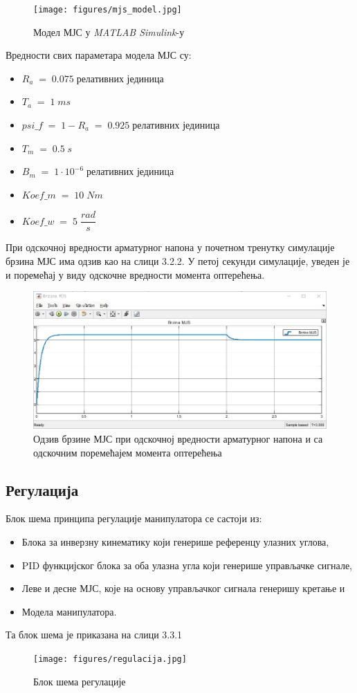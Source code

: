 \documentclass[12pt]{article}
\begin{document}
\begin{figure}[H]
    \centering
    \texttt{[image: figures/mjs\_model.jpg]}
    \caption{Модел МЈС у \textit{MATLAB Simulink}-у}
    \label{fig:мјс_simulink}
\end{figure}
Вредности свих параметара модела МЈС су:
\begin{itemize}
    \item $R_a\;=\;0.075\;$релативних јединица
    \item $T_a\;=\;1\;ms$
    \item $psi\_f\;=\;1-R_a\;=\;0.925\;$релативних јединица
    \item $T_m\;=\;0.5\;s$
    \item $B_m\;=\;1\cdot10^{-6}\;$релативних јединица
    \item $Koef\_m\;=\;10\;Nm$
    \item $Koef\_w\;=\;5\;\dfrac{rad}{s}$
\end{itemize}
При одскочној вредности арматурног напона у почетном тренутку симулације брзина МЈС има одзив као на слици 3.2.2. У петој секунди симулације, уведен је и поремећај у виду одскочне вредности момента оптерећења.
\begin{figure}[H]
    \centering
    \includegraphics[width=17.5cm]{figures/brzina_mjs.jpg}
    \caption{Одзив брзине МЈС при одскочној вредности арматурног напона и са одскочним поремећајем момента оптерећења}
    \label{fig:брзина_мјс}
\end{figure}

\subsection{Регулација}
Блок шема принципа регулације манипулатора се састоји из:
\begin{itemize}
    \item Блока за инверзну кинематику који генерише референцу улазних углова,
    \item PID функцијског блока за оба улазна угла који генерише управљачке сигнале,
    \item Леве и десне МЈС, које на основу управљачког сигнала генеришу кретање и
    \item Модела манипулатора.
\end{itemize}
Та блок шема је приказана на слици 3.3.1
\begin{figure}[H]
    \centering
    \texttt{[image: figures/regulacija.jpg]}
    \caption{Блок шема регулације}
    \label{fig:регулација}
\end{figure}
\end{document}
